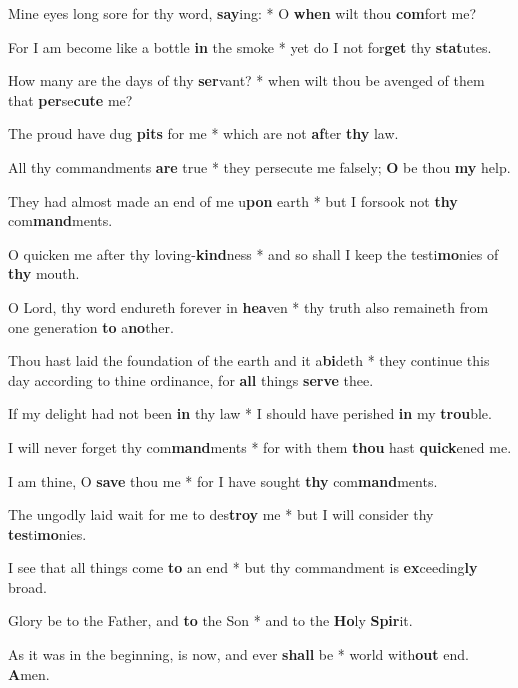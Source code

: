 \begin{multicols}{2}
	Mine eyes long sore for thy word, \textbf{say}ing: * O \textbf{when} wilt thou \textbf{com}fort me?
	
	For I am become like a bottle \textbf{in} the smoke * yet do I not for\textbf{get} thy \textbf{stat}utes.
	
	How many are the days of thy \textbf{ser}vant? * when wilt thou be avenged of them that \textbf{per}se\textbf{cute} me?
	
	The proud have dug \textbf{pits} for me * which are not \textbf{af}ter \textbf{thy} law.
	
	All thy commandments \textbf{are} true * they persecute me falsely; \textbf{O} be thou \textbf{my} help.
	
	They had almost made an end of me u\textbf{pon} earth * but I forsook not \textbf{thy} com\textbf{mand}ments.
	
	O quicken me after thy loving-\textbf{kind}ness * and so shall I keep the testi\textbf{mo}nies of \textbf{thy} mouth.
	
	O Lord, thy word endureth forever in \textbf{hea}ven * thy truth also remaineth from one generation \textbf{to} a\textbf{no}ther.
	
	Thou hast laid the foundation of the earth and it a\textbf{bi}deth * they continue this day according to thine ordinance, for \textbf{all} things \textbf{serve} thee.
	
	If my delight had not been \textbf{in} thy law * I should have perished \textbf{in} my \textbf{trou}ble.
	
	I will never forget thy com\textbf{mand}ments * for with them \textbf{thou} hast \textbf{quick}ened me.
	
	I am thine, O \textbf{save} thou me * for I have sought \textbf{thy} com\textbf{mand}ments.
	
	The ungodly laid wait for me to des\textbf{troy} me * but I will consider thy \textbf{tes}ti\textbf{mo}nies.
	
	I see that all things come \textbf{to} an end * but thy commandment is \textbf{ex}ceeding\textbf{ly} broad.
	
	Glory be to the Father, and \textbf{to} the Son * and to the \textbf{Ho}ly \textbf{Spir}it.
	
	As it was in the beginning, is now, and ever \textbf{shall} be * world with\textbf{out} end. \textbf{A}men.
\end{multicols}